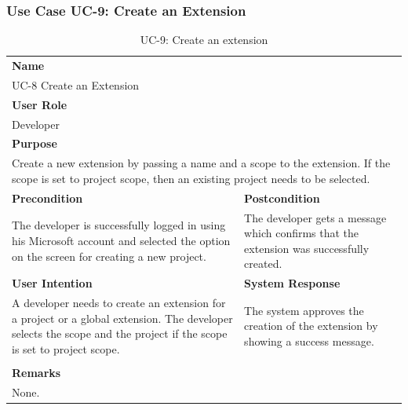\subsubsection{Use Case UC-9: Create an Extension}\label{subsubsec:use-case-uc-9:-create-an-extension}

\begin{table}[H]
    \centering
    \begin{tabular}{|p{}|p{}|}

        \hline
        \multicolumn{2}{|l|}{\rowcolor{gray!50}\textbf{Name}} \\
        \multicolumn{2}{|l|}{UC-8 Create an Extension} \\ \hline

        \multicolumn{2}{|l|}{\rowcolor{gray!50}\textbf{User Role}} \\
        \multicolumn{2}{|l|}{Developer} \\ \hline

        \multicolumn{2}{|l|}{\rowcolor{gray!50}\textbf{Purpose}} \\
        \multicolumn{2}{|p{1\textwidth}|}{Create a new extension by passing a name and a scope to the extension. If the scope is set to project scope, then an existing project needs to be selected.} \\ \hline

        \rowcolor{gray!50}\textbf{Precondition} & \rowcolor{gray!50}\textbf{Postcondition} \\
        The developer is successfully logged in using his Microsoft account and selected the option on the screen for creating a new project.
        &
        The developer gets a message which confirms that the extension was successfully created.\\ \hline

        \rowcolor{gray!50}\textbf{User Intention} & \rowcolor{gray!50}\textbf{System Response} \\
        A developer needs to create an extension for a project or a global extension.
        The developer selects the scope and the project if the scope is set to project scope.
        &
        The system approves the creation of the extension by showing a success message. \\ \hline

        & \\ \hline

        \multicolumn{2}{|l|}{\rowcolor{gray!50}\textbf{Remarks}} \\
        \multicolumn{2}{|p{1\textwidth}|}{None.} \\ \hline
    \end{tabular}
    \caption{UC-9: Create an extension}
    \label{tab:uc-create-extension}
\end{table}

